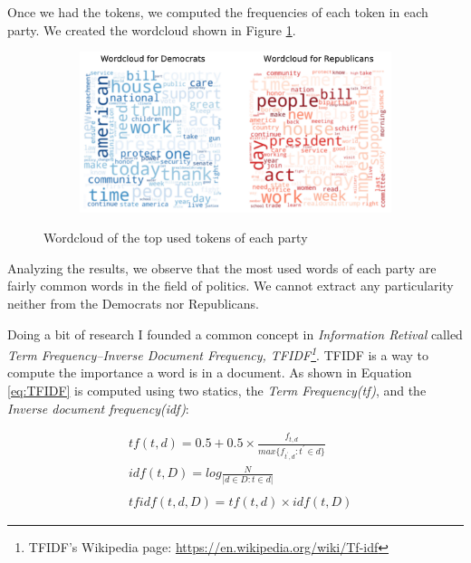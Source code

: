 \documentclass{article}
\begin{document}
Once we had the tokens, we computed the frequencies of each token in each party. We created the wordcloud shown in Figure \ref{fig:WordCloud100}.

\begin{figure}[H]
    \centering
    \begin{subfigure}{.8\textwidth}
        \centering
        \includegraphics[width=1\textwidth]{./img/WordCloud100.pdf}
    \end{subfigure}
    \caption{Wordcloud of the top used tokens of each party}
    \label{fig:WordCloud100}
\end{figure}

Analyzing the results, we observe that the most used words of each party are fairly common words in the field of politics. We cannot extract any particularity neither from the Democrats nor Republicans.

Doing a bit of research I founded a common concept in \textit{Information Retival} called \textit{Term Frequency–Inverse Document Frequency, TFIDF\footnote{TFIDF's Wikipedia page: \url{https://en.wikipedia.org/wiki/Tf-idf}}}. TFIDF is a way to compute the importance a word is in a document. As shown in Equation \ref{eq:TFIDF} is computed using two statics, the \textit{Term Frequency(tf)}, and the \textit{Inverse document frequency(idf)}:

\begin{equation} \label{eq:TFIDF}
    \begin{split}
        & tf(t,d) = 0.5 + 0.5\times \frac{f_{t,d}}{max\{f_{t^{'},d}: t^{'} \in d\}} \\
        & idf(t,D) = log \frac{N}{|d\in D:t\in d|} \\ \\
        & tfidf(t,d,D)  = tf(t,d)\times idf(t,D) 
    \end{split}
\end{equation}
\end{document}

